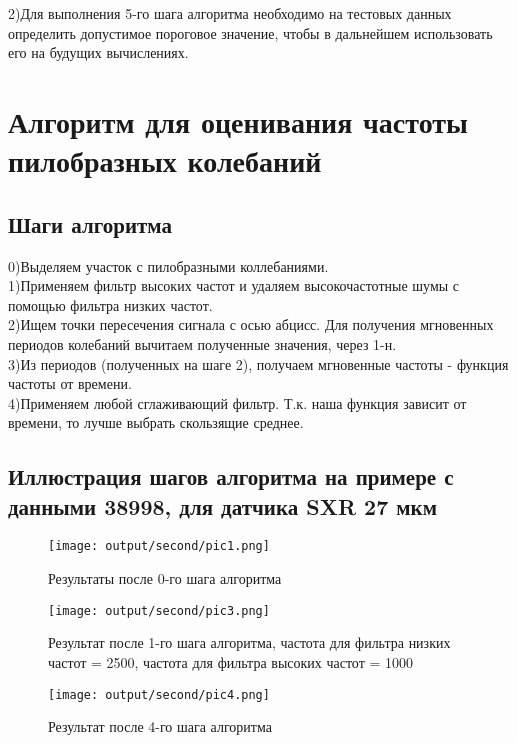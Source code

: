 \documentclass[a4]{article}
\begin{document}
			2)Для выполнения 5-го шага алгоритма необходимо на тестовых данных определить допустимое пороговое значение, чтобы в дальнейшем использовать его на будущих вычислениях.\\
		
		\newpage
		\section{Алгоритм для оценивания частоты пилобразных колебаний}
			\subsection{Шаги алгоритма}
				0)Выделяем участок с пилобразными коллебаниями.\\
				
				1)Применяем фильтр высоких частот и удаляем высокочастотные шумы с помощью фильтра низких частот.\\
				
				2)Ищем точки пересечения сигнала с осью абцисс. Для получения мгновенных периодов колебаний вычитаем полученные значения, через 1-н.\\
				
				3)Из периодов (полученных на шаге 2), получаем мгновенные частоты - функция частоты от времени.\\
				
				4)Применяем любой сглаживающий фильтр. Т.к. наша функция зависит от времени, то лучше выбрать скользящие среднее.
			\newpage
			\subsection{Иллюстрация шагов алгоритма на примере с данными 38998, для датчика SXR 27 мкм}
			\begin{center}
				\newpage
				\begin{figure}[h!]
					\texttt{[image: output/second/pic1.png]}\caption[Результаты после 0-го шага алгоритма]{Результаты после 0-го шага алгоритма}
				\end{figure}
				\newpage
				\begin{figure}[h!]
					\texttt{[image: output/second/pic3.png]}\caption[Результат после 1-го шага алгоритма, частота для фильтра низких частот = 2500, частота для фильтра высоких частот = 1000]{Результат после 1-го шага алгоритма, частота для фильтра низких частот = 2500, частота для фильтра высоких частот = 1000}
				\end{figure}
				\newpage
				\begin{figure}[h!]
					\texttt{[image: output/second/pic4.png]} \caption[Результат после 4-го шага алгоритма]{Результат после 4-го шага алгоритма}
				\end{figure}
				
			\end{center}
		\newpage
\end{document}
